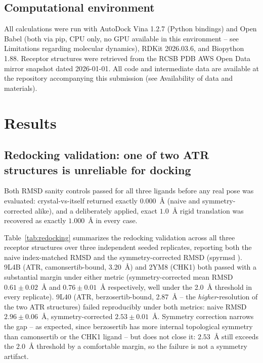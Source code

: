 \documentclass[11pt]{article}
\begin{document}
\subsection*{Computational environment}

All calculations were run with AutoDock Vina 1.2.7 (Python bindings) and
Open Babel (both via pip, CPU only, no GPU available in this environment --
see Limitations regarding molecular dynamics), RDKit 2026.03.6,
and Biopython 1.88. Receptor structures were retrieved
from the RCSB PDB AWS Open Data mirror snapshot dated 2026-01-01. All code
and intermediate data are available at the repository accompanying this
submission (see Availability of data and materials).

\section*{Results}

\subsection*{Redocking validation: one of two ATR structures is unreliable
for docking}

Both RMSD sanity controls passed for all three ligands before any real pose
was evaluated: crystal-vs-itself returned exactly $0.000$~{\AA} (naive and
symmetry-corrected alike), and a deliberately applied, exact $1.0$~{\AA}
rigid translation was recovered as exactly $1.000$~{\AA} in every case.

Table~\ref{tab:redocking} summarizes the redocking validation across all
three receptor structures over three independent seeded replicates,
reporting both the naive index-matched RMSD and the symmetry-corrected
RMSD (spyrmsd \citep{meli2020}). 9L4B (ATR, camonsertib-bound, 3.20~{\AA})
and 2YM8 (CHK1) both passed with a substantial margin under either metric
(symmetry-corrected mean RMSD $0.61\pm0.02$~{\AA} and $0.76\pm0.01$~{\AA}
respectively, well under the 2.0~{\AA} threshold in every replicate). 9L40
(ATR, berzosertib-bound, 2.87~{\AA} -- the \emph{higher}-resolution of the
two ATR structures) failed reproducibly under both metrics: naive RMSD
$2.96\pm0.06$~{\AA}, symmetry-corrected $2.53\pm0.01$~{\AA}. Symmetry
correction narrows the gap -- as expected, since berzosertib has more
internal topological symmetry than camonsertib or the CHK1 ligand -- but
does not close it: $2.53$~{\AA} still exceeds the $2.0$~{\AA} threshold by
a comfortable margin, so the failure is not a symmetry artifact.
\end{document}
